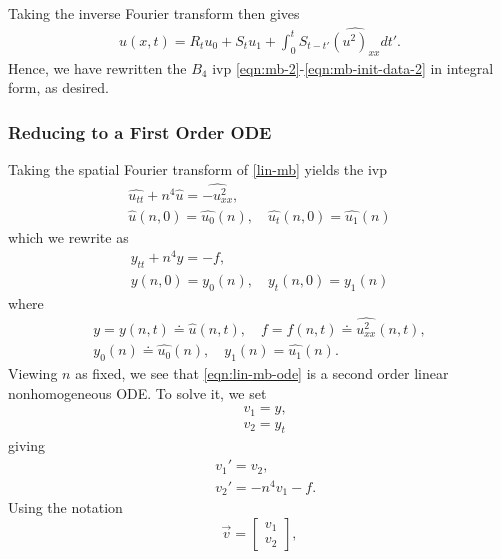 \documentclass[12pt,reqno]{amsart}
\numberwithin{equation}{section}  %
\numberwithin{figure}{section}
\newcommand{\wh}{\widehat}
\theoremstyle{plain}
\theoremstyle{definition}
\theoremstyle{remark}
\begin{document}
%
%
Taking the inverse Fourier transform then gives
%
\begin{equation*}
\begin{split}
  u(x,t) = R_{t}u_{0} + S_{t}u_{1} + \int_{0}^{t} S_{t-t'}
  \wh{(u^{2})_{xx}}dt'.
\end{split}
\end{equation*}
%
Hence, we have rewritten the $B_{4}$ ivp
\eqref{eqn:mb-2}-\eqref{eqn:mb-init-data-2} in integral form, as desired. 
%
%
\subsubsection{Reducing to a First Order ODE} 
\label{sssec:first-order-ode}
Taking the spatial Fourier transform of \eqref{lin-mb} yields
the ivp
%
%
\begin{gather*}
  \wh{u_{tt}} + n^{4} \wh{u} = \wh{-u^{2}_{xx}},
  \\
  \wh{u}(n, 0) = \wh{u_{0}}(n), \quad \wh{u_{t}}(n, 0) = \wh{u_{1}}(n)
\end{gather*}
%
%
which we rewrite as 
%
%
\begin{gather}
  \label{eqn:lin-mb-ode}
  y_{tt} + n^{4}y = -f,
  \\
  y(n, 0) = y_{0}(n), \quad y_{t}(n, 0) = y_{1}(n)
\label{eqn:lin-mb-ode-init-data}
\end{gather}
%
%
where
%
%
\begin{gather*}
  \label{not-1}
  y = y(n, t) \doteq \wh{u}(n, t), \quad f = f(n, t) \doteq
  \wh{u^{2}_{xx}}(n,t),
  \\
  \label{not-2}
  y_{0}(n) \doteq \wh{u_{0}}(n), \quad y_{1}(n) = \wh{u_{1}}(n).
\end{gather*}
%
%
Viewing $n$ as fixed, we see that \eqref{eqn:lin-mb-ode} is a second order
linear nonhomogeneous ODE. To solve it, we set 
%
%
\begin{equation*}
  \label{not-3}
\begin{split}
   & v_{1} = y, 
   \\
   & v_{2} = y_{t}
\end{split}
\end{equation*}
%
%
giving
%
%
\begin{equation*}
\begin{split}
  & v_{1}' = v_{2},
  \\
  & v_{2}' = -n^{4}v_{1} - f.
\end{split}
\end{equation*}
%
%
Using the notation
%
%
\begin{equation*}
  \vec v =
  \begin{bmatrix}
     v_{1}  \\
     v_{2} 
  \end{bmatrix},
\end{equation*}
\end{document}
